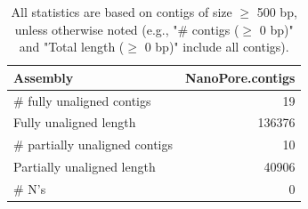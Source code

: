 \documentclass[12pt,a4paper]{article}
\begin{document}
\begin{table}[ht]
\begin{center}
\caption{All statistics are based on contigs of size $\geq$ 500 bp, unless otherwise noted (e.g., "\# contigs ($\geq$ 0 bp)" and "Total length ($\geq$ 0 bp)" include all contigs).}
\begin{tabular}{|l*{1}{|r}|}
\hline
Assembly & NanoPore.contigs \\ \hline
\# fully unaligned contigs & 19 \\ \hline
Fully unaligned length & 136376 \\ \hline
\# partially unaligned contigs & 10 \\ \hline
Partially unaligned length & 40906 \\ \hline
\# N's & 0 \\ \hline
\end{tabular}
\end{center}
\end{table}
\end{document}
